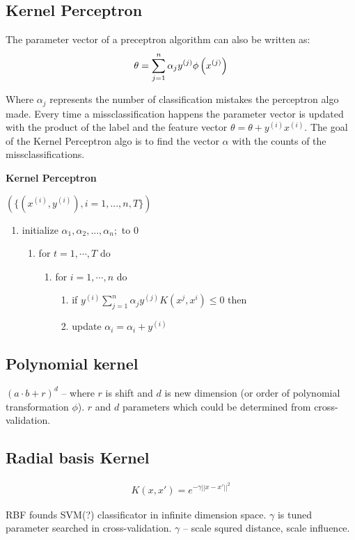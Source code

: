 \subsection{Kernel Perceptron}

The parameter vector of a preceptron algorithm can also be written as: 
\begin{align*}
\displaystyle  \displaystyle \theta = \sum _{j=1}^{n} \alpha _ j y^{(j)} \phi \left(x^{(j)}\right)
\end{align*}

Where $\alpha_j$ represents the number of classification mistakes the perceptron algo made. Every time a missclassification happens the parameter vector is updated with the product of the label and the feature vector $\theta  = \theta + y^{(i)} x^{(i)}$. The goal of the Kernel Perceptron algo is to find the vector $\alpha$ with the counts of the missclassifications.

\textbf{Kernel Perceptron}

$\displaystyle \left(\big \{ (x^{(i)}, y^{(i)}), i=1,...,n, T \big \} \right)$
\begin{enumerate}[\indent {}]
	\item initialize  $\alpha _1, \alpha _2, ..., \alpha _ n;$ to 0
	\begin{enumerate}[\indent {}]
		\item for $t=1,\cdots,T$ do
		\begin{enumerate}[\indent {}]
			\item for $i=1,\cdots,n$ do
			\begin{enumerate}[\indent {}]
				\item if $y^{(i)}\sum _{j=1}^{n} \alpha _ j y^{(j)} K(x^{j},x^{i}) \leq 0$ then
				\item update $\alpha _ i = \alpha _ i + y^{(i)}$
			\end{enumerate}
		\end{enumerate}
	\end{enumerate}
\end{enumerate}

\subsection{Polynomial kernel}
$(a \cdot b+r)^d$ -- where $r$ is shift and $d$ is new dimension 
(or order of polynomial transformation $\phi$). $r$ and $d$ parameters which
could be determined from cross-validation. 

\subsection{Radial basis Kernel}
\begin{align*}
K(x,x') = e^{-\gamma {||x-x'||}^2}
\end{align*}

RBF founds SVM(?) classificator in infinite dimension space. 
$\gamma$ is tuned parameter searched in cross-validation.
$\gamma$ -- scale squred distance, scale influence.